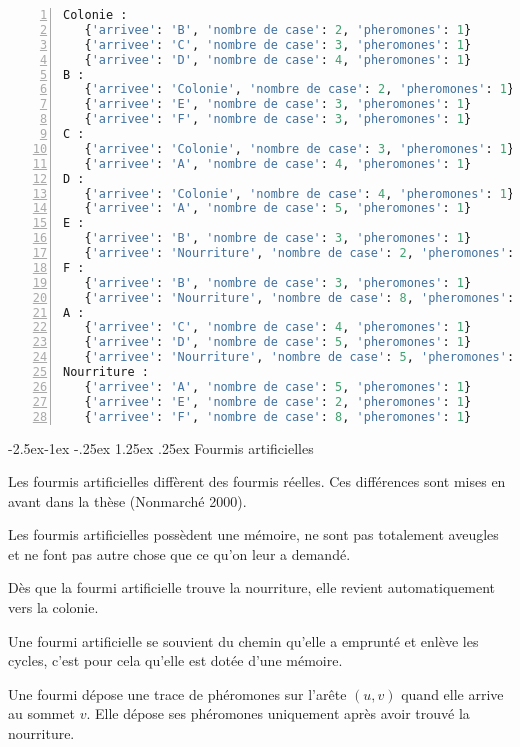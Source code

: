 \documentclass[
12pt,
french,
]{article}
\makeatletter
\renewcommand\paragraph{\@startsection{paragraph}{4}{\z@}%
        {-2.5ex\@plus -1ex \@minus -.25ex}%
        {1.25ex \@plus .25ex}%
        {\normalfont\normalsize\bfseries}}
\makeatother
\begin{document}
\begin{lstlisting}[language=Python, numbers=left, caption={Liste d adjacence}]
Colonie :
   {'arrivee': 'B', 'nombre de case': 2, 'pheromones': 1}
   {'arrivee': 'C', 'nombre de case': 3, 'pheromones': 1}
   {'arrivee': 'D', 'nombre de case': 4, 'pheromones': 1}
B :
   {'arrivee': 'Colonie', 'nombre de case': 2, 'pheromones': 1}
   {'arrivee': 'E', 'nombre de case': 3, 'pheromones': 1}
   {'arrivee': 'F', 'nombre de case': 3, 'pheromones': 1}
C :
   {'arrivee': 'Colonie', 'nombre de case': 3, 'pheromones': 1}
   {'arrivee': 'A', 'nombre de case': 4, 'pheromones': 1}
D :
   {'arrivee': 'Colonie', 'nombre de case': 4, 'pheromones': 1}
   {'arrivee': 'A', 'nombre de case': 5, 'pheromones': 1}
E :
   {'arrivee': 'B', 'nombre de case': 3, 'pheromones': 1}
   {'arrivee': 'Nourriture', 'nombre de case': 2, 'pheromones': 1}
F :
   {'arrivee': 'B', 'nombre de case': 3, 'pheromones': 1}
   {'arrivee': 'Nourriture', 'nombre de case': 8, 'pheromones': 1}
A :
   {'arrivee': 'C', 'nombre de case': 4, 'pheromones': 1}
   {'arrivee': 'D', 'nombre de case': 5, 'pheromones': 1}
   {'arrivee': 'Nourriture', 'nombre de case': 5, 'pheromones': 1}
Nourriture :
   {'arrivee': 'A', 'nombre de case': 5, 'pheromones': 1}
   {'arrivee': 'E', 'nombre de case': 2, 'pheromones': 1}
   {'arrivee': 'F', 'nombre de case': 8, 'pheromones': 1}
\end{lstlisting}

\hypertarget{fourmis-artificielles}{%
\paragraph{Fourmis artificielles}\label{fourmis-artificielles}}

Les fourmis artificielles diffèrent des fourmis réelles. Ces différences
sont mises en avant dans la thèse (Nonmarché 2000).

Les fourmis artificielles possèdent une mémoire, ne sont pas totalement
aveugles et ne font pas autre chose que ce qu'on leur a demandé.

Dès que la fourmi artificielle trouve la nourriture, elle revient
automatiquement vers la colonie.

Une fourmi artificielle se souvient du chemin qu'elle a emprunté et
enlève les cycles, c'est pour cela qu'elle est dotée d'une mémoire.

Une fourmi dépose une trace de phéromones sur l'arête \((u,v)\) quand
elle arrive au sommet \(v\). Elle dépose ses phéromones uniquement après
avoir trouvé la nourriture.
\end{document}
